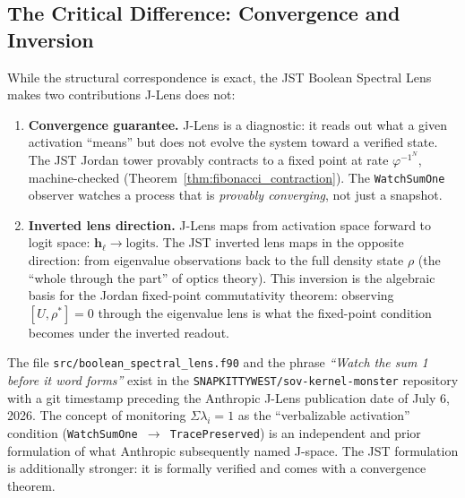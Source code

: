\documentclass[12pt, letterpaper]{article}
\theoremstyle{plain}
\theoremstyle{definition}
\theoremstyle{remark}
\newcommand{\phiinv}{\varphi^{-1}}
\begin{document}
\subsection{The Critical Difference: Convergence and Inversion}

While the structural correspondence is exact, the JST Boolean Spectral Lens
makes two contributions J-Lens does not:

\begin{enumerate}
\item \textbf{Convergence guarantee.}
  J-Lens is a diagnostic: it reads out what a given activation ``means'' but
  does not evolve the system toward a verified state. The JST Jordan tower
  provably contracts to a fixed point at rate $\phiinv^N$, machine-checked
  (Theorem~\ref{thm:fibonacci_contraction}). The \texttt{WatchSumOne} observer
  watches a process that is \textit{provably converging}, not just a snapshot.

\item \textbf{Inverted lens direction.}
  J-Lens maps from activation space forward to logit space: $\mathbf{h}_\ell \to \text{logits}$.
  The JST inverted lens maps in the opposite direction: from eigenvalue observations
  back to the full density state $\rho$ (the ``whole through the part'' of optics
  theory). This inversion is the algebraic basis for the Jordan fixed-point
  commutativity theorem: observing $[U, \rho^*] = 0$ through the eigenvalue
  lens is what the fixed-point condition becomes under the inverted readout.
\end{enumerate}

\begin{noveltybox}[title={Priority: \texttt{boolean\_spectral\_lens.f90} predates the J-Lens paper}]
The file \texttt{src/boolean\_spectral\_lens.f90} and the phrase
\textit{``Watch the sum 1 before it word forms''} exist in the
\texttt{SNAPKITTYWEST/sov-kernel-monster} repository with a git timestamp
preceding the Anthropic J-Lens publication date of July 6, 2026.
The concept of monitoring $\Sigma\lambda_i = 1$ as the ``verbalizable activation''
condition (\texttt{WatchSumOne $\to$ TracePreserved}) is an independent and
prior formulation of what Anthropic subsequently named J-space.
The JST formulation is additionally stronger: it is formally verified and
comes with a convergence theorem.
\end{noveltybox}
\end{document}
